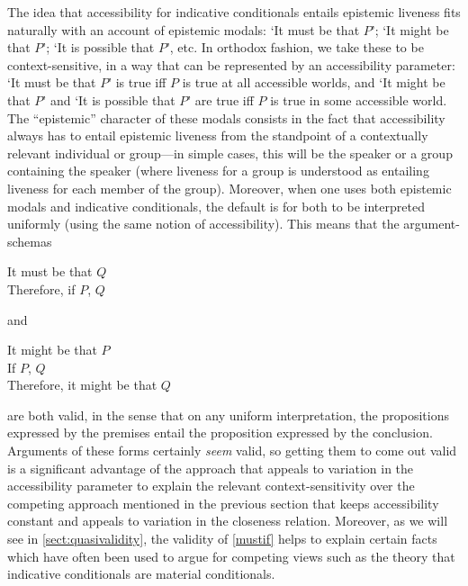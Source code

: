\documentclass[If.tex]{subfiles}
\begin{document}
The idea that accessibility for indicative conditionals entails epistemic liveness fits naturally with an account of epistemic modals: ‘It must be that $P$’; ‘It might be that $P$’; ‘It is possible that $P$’, etc. In orthodox fashion, we take these to be context-sensitive, in a way that can be represented by an accessibility parameter: ‘It must be that $P$’ is true iff $P$ is true at all accessible worlds, and ‘It might be that $P$’ and ‘It is possible that $P$’ are true iff $P$ is true in some accessible world. The “epistemic” character of these modals consists in the fact that accessibility always has to entail epistemic liveness from the standpoint of a contextually relevant individual or group---in simple cases, this will be the speaker or a group containing the speaker (where liveness for a group is understood as entailing liveness for each member of the group).  Moreover, when one uses both epistemic modals and indicative conditionals, the default is for both to be interpreted uniformly (using the same notion of accessibility).  This means that the argument-schemas
\begin{prop}
	\sitem[Must-if] \label{mustif}
	\parbox[t]{\linewidth}{It must be that $Q$\\	
	Therefore, if $P$, $Q$}
\end{prop}
and 
\begin{prop} \label{mightpres}
	\parbox[t]{\linewidth}{It might be that $P$\\
	If $P$, $Q$\\
	Therefore, it might be that $Q$}
\end{prop}
are both valid, in the sense that on any uniform interpretation, the propositions expressed by the premises entail the proposition expressed by the conclusion.  Arguments of these forms certainly \emph{seem} valid, so getting them to come out valid is a significant advantage of the approach that appeals to variation in the accessibility parameter to explain the relevant context-sensitivity over the competing approach mentioned in the previous section that keeps accessibility constant and appeals to variation in the closeness relation.  Moreover, as we will see in \autoref{sect:quasivalidity}, the validity of \ref{mustif} helps to explain certain facts which have often been used to argue for competing views such as the theory that indicative conditionals are material conditionals.

\end{document}
